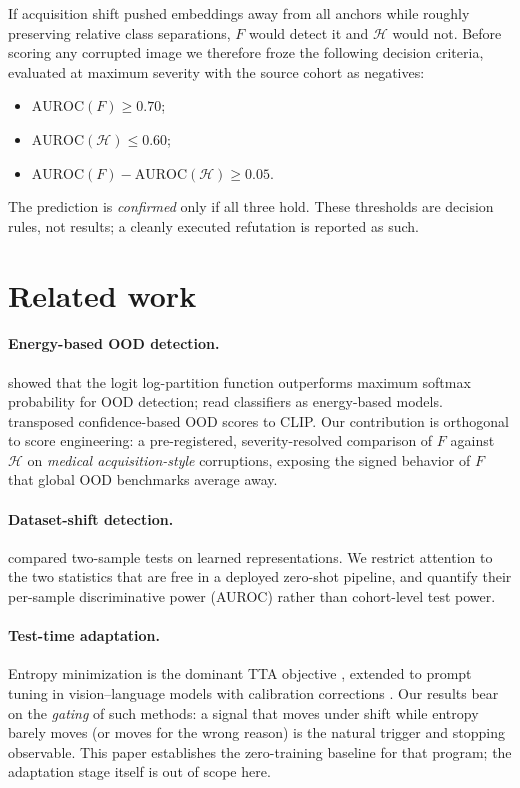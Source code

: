 \documentclass[11pt]{article}
\newcommand{\Hent}{\mathcal{H}}
\begin{document}
If acquisition shift pushed embeddings away from all anchors while roughly
preserving relative class separations, $F$ would detect it and $\Hent$ would
not. Before scoring any corrupted image we therefore froze the following
decision criteria, evaluated at maximum severity with the source cohort as
negatives:
\begin{itemize}
\item[C1.] $\mathrm{AUROC}(F) \ge 0.70$;
\item[C2.] $\mathrm{AUROC}(\Hent) \le 0.60$;
\item[C3.] $\mathrm{AUROC}(F) - \mathrm{AUROC}(\Hent) \ge 0.05$.
\end{itemize}
The prediction is \emph{confirmed} only if all three hold. These thresholds
are decision rules, not results; a cleanly executed refutation is reported as
such.

\section{Related work}
\label{sec:related}

\paragraph{Energy-based OOD detection.} \citet{liu2020energy} showed that the
logit log-partition function outperforms maximum softmax probability
\citep{hendrycks2017msp} for OOD detection; \citet{grathwohl2020jem} read
classifiers as energy-based models. \citet{ming2022delving} transposed
confidence-based OOD scores to CLIP. Our contribution is orthogonal to score
engineering: a pre-registered, severity-resolved comparison of $F$ against
$\Hent$ on \emph{medical acquisition-style} corruptions, exposing the signed
behavior of $F$ that global OOD benchmarks average away.

\paragraph{Dataset-shift detection.} \citet{rabanser2019failing} compared
two-sample tests on learned representations. We restrict attention to the two
statistics that are free in a deployed zero-shot pipeline, and quantify their
per-sample discriminative power (AUROC) rather than cohort-level test power.

\paragraph{Test-time adaptation.} Entropy minimization is the dominant TTA
objective \citep{wang2021tent,niu2022eata,niu2023sar}, extended to prompt
tuning in vision--language models \citep{shu2022tpt} with calibration
corrections \citep{yoon2024ctpt}. Our results bear on the \emph{gating} of
such methods: a signal that moves under shift while entropy barely moves (or
moves for the wrong reason) is the natural trigger and stopping observable.
This paper establishes the zero-training baseline for that program; the
adaptation stage itself is out of scope here.
\end{document}
